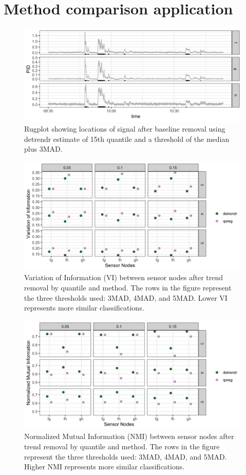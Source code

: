 \documentclass[12pt]{article}
\begin{document}
	
	\section{Method comparison application}
	\begin{figure}[!h]
		\caption{Rugplot showing locations of signal after baseline removal using detrendr estimate of 15th quantile and a threshold of the median plus 3MAD.}
		\includegraphics[width = \linewidth]{Figures/corrected_rugplot.png}
	\end{figure}

	\begin{figure}[!h]
		\centering
		\caption{Variation of Information (VI) between sensor nodes after trend removal by quantile and method. The rows in the figure represent the three thresholds used: 3MAD, 4MAD, and 5MAD. Lower VI represents more similar classifications. }
		\includegraphics[width = .9\linewidth]{Figures/VI_app_short.png}
	\end{figure}
	
		\begin{figure}[!h]
		\centering
		\caption{Normalized Mutual Information (NMI) between sensor nodes after trend removal by quantile and method. The rows in the figure represent the three thresholds used: 3MAD, 4MAD, and 5MAD. Higher NMI represents more similar classifications. }
		\includegraphics[width = .9\linewidth]{Figures/NMI_app_short.png}
	\end{figure}

	\newpage
	 
	 
	 
	
\end{document}
